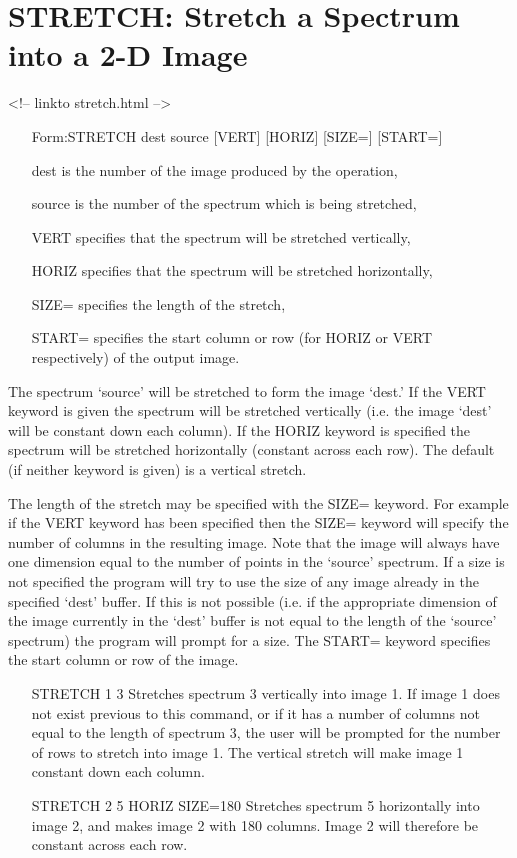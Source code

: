 \section{STRETCH: Stretch a Spectrum into a 2-D Image}
\begin{rawhtml}
<!-- linkto stretch.html -->
\end{rawhtml}
\begin{itemize}
  \item[Form:STRETCH dest source {[VERT]} {[HORIZ]} {[SIZE=]} 
       {[START=]}\hfill]{}
  \item[dest]{is the number of the image produced by the operation,}
  \item[source]{is the number of the spectrum which is being stretched,}
  \item[VERT]{specifies that the spectrum will be stretched vertically,}
  \item[HORIZ]{specifies that the spectrum will be stretched horizontally,}
  \item[SIZE=]{specifies the length of the stretch,}
  \item[START=]{specifies the start column or row (for HORIZ or
       VERT respectively) of the output image.}
\end{itemize}

The spectrum `source' will be stretched to form the image `dest.'  If the
VERT keyword is given the spectrum will be stretched vertically (i.e. the
image `dest' will be constant down each column).  If the HORIZ keyword is
specified the spectrum will be stretched horizontally (constant across each
row).  The default (if neither keyword is given) is a vertical stretch.

The length of the stretch may be specified with the SIZE= keyword.  For
example if the VERT keyword has been specified then the SIZE= keyword will
specify the number of columns in the resulting image.  Note that the image
will always have one dimension equal to the number of points in the
`source' spectrum.  If a size is not specified the program will try to use
the size of any image already in the specified `dest' buffer.  If this is
not possible (i.e. if the appropriate dimension of the image currently in
the `dest' buffer is not equal to the length of the `source' spectrum) the
program will prompt for a size.  The START= keyword specifies the start
column or row of the image.

\begin{itemize}
  \item[STRETCH 1 3\hfill]{Stretches spectrum 3 vertically into image 1.
       If image 1 does not exist previous to this command, or if it has a
       number of columns not equal to the length of spectrum 3, the user
       will be prompted for the number of rows to stretch into image 1.
       The vertical stretch will make image 1 constant down each column.}

  \item[STRETCH 2 5 HORIZ SIZE=180\hfill]{Stretches spectrum 5 horizontally
       into image 2, and makes image 2 with 180 columns.  Image 2 will
       therefore be constant across each row.}
\end{itemize}

